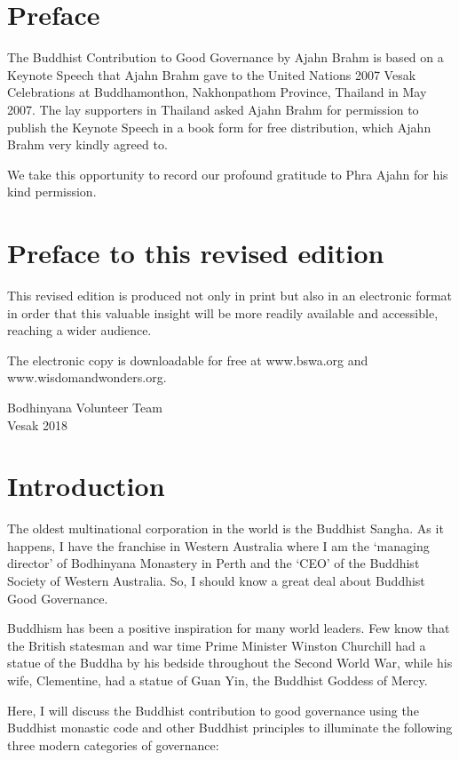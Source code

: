 ﻿\documentclass[11pt, openany]{book}
\begin{document}
\chapter*{Preface}

The Buddhist Contribution to Good Governance by Ajahn Brahm is based on a Keynote Speech that Ajahn Brahm gave to the United Nations 2007 Vesak Celebrations at Buddhamonthon, Nakhonpathom Province, Thailand in May 2007. The lay supporters in Thailand asked Ajahn Brahm for permission to publish the Keynote Speech in a book form for free distribution, which Ajahn Brahm very kindly agreed to.

We take this opportunity to record our profound gratitude to Phra Ajahn for his kind permission.

\chapter*{Preface to this revised edition}

This revised edition is produced not only in print but also in an electronic format in order that this valuable insight will be more readily available and accessible, reaching a wider audience.

The electronic copy is downloadable for free at www.bswa.org and www.wisdomandwonders.org.

\bigskip

\noindent Bodhinyana Volunteer Team\\
\noindent Vesak 2018

\chapter*{Introduction}

The oldest multinational corporation in the world is the Buddhist Sangha. As it happens, I have the franchise in Western Australia where I am the ‘managing director’ of Bodhinyana Monastery in Perth and the ‘CEO’ of the Buddhist Society of Western Australia. So, I should know a great deal about Buddhist Good Governance.

Buddhism has been a positive inspiration for many world leaders. Few know that the British statesman and war time Prime Minister Winston Churchill had a statue of the Buddha by his bedside throughout the Second World War, while his wife, Clementine, had a statue of Guan Yin, the Buddhist Goddess of Mercy.

Here, I will discuss the Buddhist contribution to good governance using the Buddhist monastic code and other Buddhist principles to illuminate the following three modern categories of governance:
\end{document}
